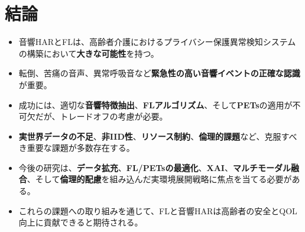 \documentclass[unicode,12pt,aspectratio=169, dvipdfmx]{beamer}
\begin{document}
\section{結論}
\begin{frame}{\insertsectionhead}
    \begin{itemize}
        \item 音響HARとFLは、高齢者介護におけるプライバシー保護異常検知システムの構築において\textbf{大きな可能性}を持つ。
        \item 転倒、苦痛の音声、異常呼吸音など\textbf{緊急性の高い音響イベントの正確な認識}が重要。
        \item 成功には、適切な\textbf{音響特徴抽出}、\textbf{FLアルゴリズム}、そして\textbf{PETs}の適用が不可欠だが、トレードオフの考慮が必要。
        \item \textbf{実世界データの不足}、\textbf{非IID性}、\textbf{リソース制約}、\textbf{倫理的課題}など、克服すべき重要な課題が多数存在する。
        \item 今後の研究は、\textbf{データ拡充}、\textbf{FL/PETsの最適化}、\textbf{XAI}、\textbf{マルチモーダル融合}、そして\textbf{倫理的配慮}を組み込んだ実環境展開戦略に焦点を当てる必要がある。
        \item これらの課題への取り組みを通じて、FLと音響HARは高齢者の安全とQOL向上に貢献できると期待される。
    \end{itemize}
\end{frame}

\begin{comment}
\end{comment}
\end{document}
